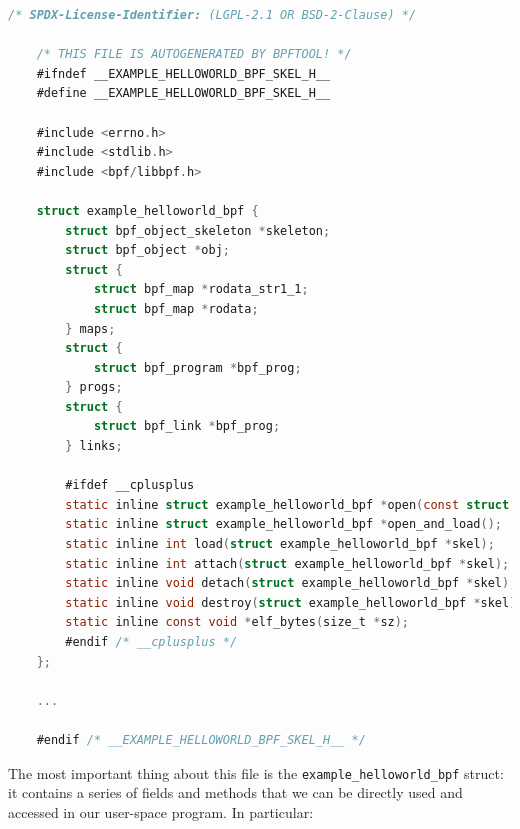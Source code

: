 \begin{lstlisting}[style=cstyle, language=C, caption={``Hello world!'' skeleton file using libbpf-bootstrap}, title=example\_helloworld.skel.h]
	/* SPDX-License-Identifier: (LGPL-2.1 OR BSD-2-Clause) */
	
	/* THIS FILE IS AUTOGENERATED BY BPFTOOL! */
	#ifndef __EXAMPLE_HELLOWORLD_BPF_SKEL_H__
	#define __EXAMPLE_HELLOWORLD_BPF_SKEL_H__
	
	#include <errno.h>
	#include <stdlib.h>
	#include <bpf/libbpf.h>
	
	struct example_helloworld_bpf {
		struct bpf_object_skeleton *skeleton;
		struct bpf_object *obj;
		struct {
			struct bpf_map *rodata_str1_1;
			struct bpf_map *rodata;
		} maps;
		struct {
			struct bpf_program *bpf_prog;
		} progs;
		struct {
			struct bpf_link *bpf_prog;
		} links;
		
		#ifdef __cplusplus
		static inline struct example_helloworld_bpf *open(const struct bpf_object_open_opts *opts = nullptr);
		static inline struct example_helloworld_bpf *open_and_load();
		static inline int load(struct example_helloworld_bpf *skel);
		static inline int attach(struct example_helloworld_bpf *skel);
		static inline void detach(struct example_helloworld_bpf *skel);
		static inline void destroy(struct example_helloworld_bpf *skel);
		static inline const void *elf_bytes(size_t *sz);
		#endif /* __cplusplus */
	};
	
	...
	
	#endif /* __EXAMPLE_HELLOWORLD_BPF_SKEL_H__ */
\end{lstlisting}

The most important thing about this file is the \colorbox{backcolour}{\lstinline[style=highlight, language=bash]|example_helloworld_bpf|} struct: it contains a series of fields and methods that we can be directly used and accessed in our user-space program.
In particular:

